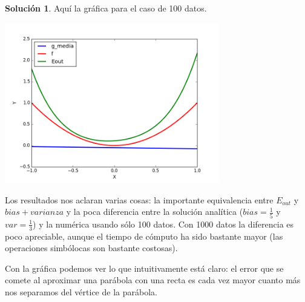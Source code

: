 \documentclass[a4paper, 11pt]{article}
\theoremstyle{definition}
\newtheorem*{solucion}{Solución}
\begin{document}
\begin{solucion}
    Aquí la gráfica para el caso de 100 datos.

    \centerline{\includegraphics[width=0.7\textwidth]{salida_bonus.png}}

    Los resultados nos aclaran varias cosas: la importante equivalencia entre $E_{out}$ y $bias+varianza$ y la poca diferencia entre la solución analítica ($bias=\frac{1}{5}$ y $var=\frac{1}{3}$) y la numérica usando sólo 100 datos. Con 1000 datos la diferencia es poco apreciable, aunque el tiempo de cómputo ha sido bastante mayor (las operaciones simbólocas son bastante costosas).

    Con la gráfica podemos ver lo que intuitivamente está claro: el error que se comete al aproximar una parábola con una recta es cada vez mayor cuanto más nos separamos del vértice de la parábola. 



  \end{solucion}
\end{document}
